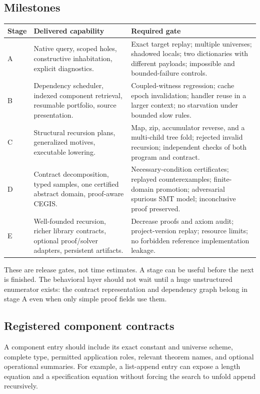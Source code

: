 \documentclass[11pt,a4paper]{article}
\theoremstyle{remark}
\begin{document}
\subsection{Milestones}

\begin{longtable}{@{}L{0.12\textwidth}L{0.38\textwidth}L{0.42\textwidth}@{}}
\toprule
Stage & Delivered capability & Required gate \\
\midrule\endhead
A & Native query, scoped holes, constructive inhabitation, explicit diagnostics. & Exact target replay; multiple universes; shadowed locals; two dictionaries with different payloads; impossible and bounded-failure controls. \\
B & Dependency scheduler, indexed component retrieval, resumable portfolio, source presentation. & Coupled-witness regression; cache epoch invalidation; handler reuse in a larger context; no starvation under bounded slow rules. \\
C & Structural recursion plans, generalized motives, executable lowering. & Map, zip, accumulator reverse, and a multi-child tree fold; rejected invalid recursion; independent checks of both program and contract. \\
D & Contract decomposition, typed samples, one certified abstract domain, proof-aware CEGIS. & Necessary-condition certificates; replayed counterexamples; finite-domain promotion; adversarial spurious SMT model; inconclusive proof preserved. \\
E & Well-founded recursion, richer library contracts, optional proof/solver adapters, persistent artifacts. & Decrease proofs and axiom audit; project-version replay; resource limits; no forbidden reference implementation leakage. \\
\bottomrule
\end{longtable}

These are release gates, not time estimates. A stage can be useful before the next is finished. The behavioral layer should not wait until a huge unstructured enumerator exists: the contract representation and dependency graph belong in stage A even when only simple proof fields use them.

\subsection{Registered component contracts}

A component entry should include its exact constant and universe scheme, complete type, permitted application roles, relevant theorem names, and optional operational summaries. For example, a list-append entry can expose a length equation and a specification equation without forcing the search to unfold append recursively.
\end{document}
